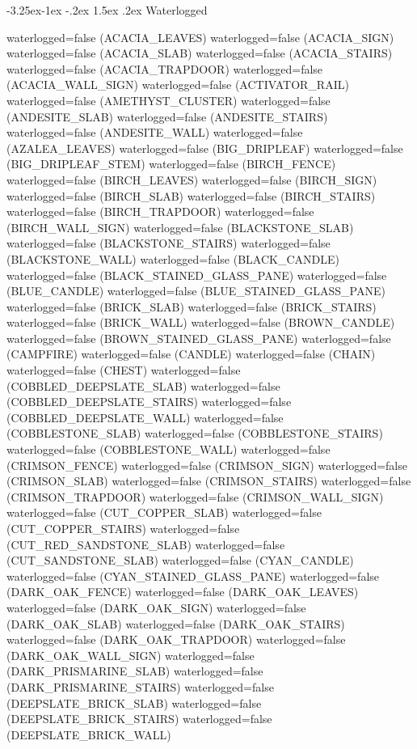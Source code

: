 \documentclass[11pt]{article}
\makeatletter
\renewcommand\subsubsection{\@startsection{subsubsection}{3}{\z@}%
                                        {-3.25ex\@plus -1ex \@minus -.2ex}%
                                         {1.5ex \@plus .2ex}%
                                         {\normalfont\normalsize\fontfamily{phv}\fontsize{14}{17}\selectfont}}
\makeatother
\begin{document}
\subsubsection{Waterlogged}

waterlogged=false (ACACIA_LEAVES)
waterlogged=false (ACACIA_SIGN)
waterlogged=false (ACACIA_SLAB)
waterlogged=false (ACACIA_STAIRS)
waterlogged=false (ACACIA_TRAPDOOR)
waterlogged=false (ACACIA_WALL_SIGN)
waterlogged=false (ACTIVATOR_RAIL)
waterlogged=false (AMETHYST_CLUSTER)
waterlogged=false (ANDESITE_SLAB)
waterlogged=false (ANDESITE_STAIRS)
waterlogged=false (ANDESITE_WALL)
waterlogged=false (AZALEA_LEAVES)
waterlogged=false (BIG_DRIPLEAF)
waterlogged=false (BIG_DRIPLEAF_STEM)
waterlogged=false (BIRCH_FENCE)
waterlogged=false (BIRCH_LEAVES)
waterlogged=false (BIRCH_SIGN)
waterlogged=false (BIRCH_SLAB)
waterlogged=false (BIRCH_STAIRS)
waterlogged=false (BIRCH_TRAPDOOR)
waterlogged=false (BIRCH_WALL_SIGN)
waterlogged=false (BLACKSTONE_SLAB)
waterlogged=false (BLACKSTONE_STAIRS)
waterlogged=false (BLACKSTONE_WALL)
waterlogged=false (BLACK_CANDLE)
waterlogged=false (BLACK_STAINED_GLASS_PANE)
waterlogged=false (BLUE_CANDLE)
waterlogged=false (BLUE_STAINED_GLASS_PANE)
waterlogged=false (BRICK_SLAB)
waterlogged=false (BRICK_STAIRS)
waterlogged=false (BRICK_WALL)
waterlogged=false (BROWN_CANDLE)
waterlogged=false (BROWN_STAINED_GLASS_PANE)
waterlogged=false (CAMPFIRE)
waterlogged=false (CANDLE)
waterlogged=false (CHAIN)
waterlogged=false (CHEST)
waterlogged=false (COBBLED_DEEPSLATE_SLAB)
waterlogged=false (COBBLED_DEEPSLATE_STAIRS)
waterlogged=false (COBBLED_DEEPSLATE_WALL)
waterlogged=false (COBBLESTONE_SLAB)
waterlogged=false (COBBLESTONE_STAIRS)
waterlogged=false (COBBLESTONE_WALL)
waterlogged=false (CRIMSON_FENCE)
waterlogged=false (CRIMSON_SIGN)
waterlogged=false (CRIMSON_SLAB)
waterlogged=false (CRIMSON_STAIRS)
waterlogged=false (CRIMSON_TRAPDOOR)
waterlogged=false (CRIMSON_WALL_SIGN)
waterlogged=false (CUT_COPPER_SLAB)
waterlogged=false (CUT_COPPER_STAIRS)
waterlogged=false (CUT_RED_SANDSTONE_SLAB)
waterlogged=false (CUT_SANDSTONE_SLAB)
waterlogged=false (CYAN_CANDLE)
waterlogged=false (CYAN_STAINED_GLASS_PANE)
waterlogged=false (DARK_OAK_FENCE)
waterlogged=false (DARK_OAK_LEAVES)
waterlogged=false (DARK_OAK_SIGN)
waterlogged=false (DARK_OAK_SLAB)
waterlogged=false (DARK_OAK_STAIRS)
waterlogged=false (DARK_OAK_TRAPDOOR)
waterlogged=false (DARK_OAK_WALL_SIGN)
waterlogged=false (DARK_PRISMARINE_SLAB)
waterlogged=false (DARK_PRISMARINE_STAIRS)
waterlogged=false (DEEPSLATE_BRICK_SLAB)
waterlogged=false (DEEPSLATE_BRICK_STAIRS)
waterlogged=false (DEEPSLATE_BRICK_WALL)
\end{document}
